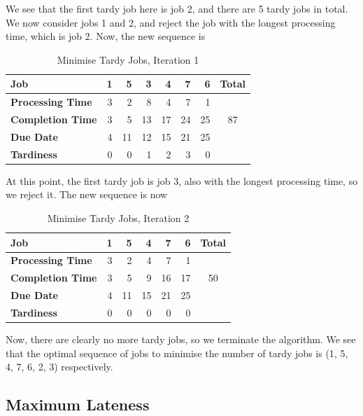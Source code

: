 \documentclass[12pt]{article}
\begin{document}
\noindent We see that the first tardy job here is job 2, and there are 5 tardy jobs in total. We now consider jobs 1 and 2, and reject the job with the longest processing time, which is job 2. Now, the new sequence is 

\begin{table}[H]
    \centering
    \begin{tabular}{l r r r r r r | c }\toprule 
        \textbf{Job} & 1 & 5 & 3 & 4 & 7 & 6 & \textbf{Total}\\ \midrule 
        \textbf{Processing Time} & 3 & 2 & 8 & 4 & 7 & 1 \\ 
        \textbf{Completion Time} & 3 & 5 & 13 & 17 & 24 & 25 & 87 \\ 
        \textbf{Due Date} & 4 &  11 & 12 & 15 & 21 & 25 \\ 
        \textbf{Tardiness} & 0 &  0 & 1 & 2 & 3 & 0 & \\ \bottomrule
    \end{tabular}
    \caption{Minimise Tardy Jobs, Iteration 1}
    \label{tab:3-tardy2}
\end{table}

\noindent At this point, the first tardy job is job 3, also with the longest processing time, so we reject it. The new sequence is now

\begin{table}[H]
    \centering
    \begin{tabular}{l r r r r r | c }\toprule 
        \textbf{Job} & 1 & 5 &  4 & 7 & 6 & \textbf{Total}\\ \midrule 
        \textbf{Processing Time} & 3 & 2 & 4 & 7 & 1 \\ 
        \textbf{Completion Time} & 3 & 5 & 9 & 16 & 17 & 50 \\ 
        \textbf{Due Date} & 4 &  11 & 15 & 21 & 25 \\ 
        \textbf{Tardiness} & 0 &  0 & 0 & 0 & 0 & \\ \bottomrule
    \end{tabular}
    \caption{Minimise Tardy Jobs, Iteration 2}
    \label{tab:3-tardy3}
\end{table}

\noindent Now, there are clearly no more tardy jobs, so we terminate the algorithm. We see that the optimal sequence of jobs to minimise the number of tardy jobs is (1, 5, 4, 7, 6, 2, 3) respectively.

\subsection*{Maximum Lateness}
\end{document}
